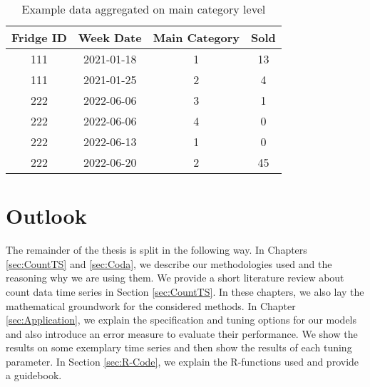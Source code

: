 \begin{table}[h!]
\centering
\begin{tabular}{cccc}
\hline
\rowcolor[HTML]{FFFFFF} 
\textbf{Fridge ID} & \textbf{Week Date} & \textbf{Main Category} & \textbf{Sold} \\ \hline
111                & 2021-01-18         & 1                      & 13             \\
111                & 2021-01-25         & 2                      & 4             \\
222                & 2022-06-06         & 3                      & 1             \\
222                & 2022-06-06         & 4                      & 0             \\
222                & 2022-06-13         & 1                      & 0             \\
222                & 2022-06-20         & 2                      & 45            \\ \hline
\end{tabular}
\caption{Example data aggregated on main category level}
\label{tab:ExampleData aggregated}
\end{table}

\section{Outlook}
\label{sec: Outlook}

The remainder of the thesis is split in the following way. In Chapters \ref{sec:CountTS} and \ref{sec:Coda}, we describe our methodologies used and the reasoning why we are using them. We provide a short literature review about count data time series in Section \ref{sec:CountTS}. In these chapters, we also lay the mathematical groundwork for the considered methods. In Chapter \ref{sec:Application}, we explain the specification and tuning options for our models and also introduce an error measure to evaluate their performance. We show the results on some exemplary time series and then show the results of each tuning parameter. In Section \ref{sec:R-Code}, we explain the R-functions used and provide a guidebook.%